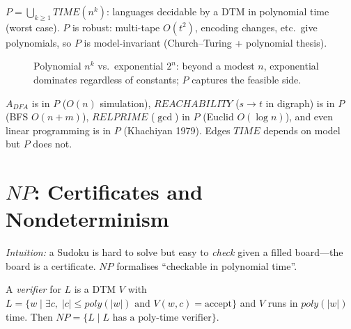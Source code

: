 \begin{definition}[$P$]
$P=\bigcup_{k\ge1}TIME(n^k)$: languages decidable by a DTM in polynomial time (worst case). $P$ is robust: multi-tape $O(t^2)$, encoding changes, etc.\ give polynomials, so $P$ is model-invariant (Church--Turing + polynomial thesis).
\end{definition}

\begin{figure}[h]
\centering
{}
\caption{Polynomial $n^k$ vs.\ exponential $2^n$: beyond a modest $n$, exponential dominates regardless of constants; $P$ captures the feasible side.}
\label{fig:poly-vs-exp}
\end{figure}

\begin{example}[Problems in $P$]
$A_{DFA}$ is in $P$ ($O(n)$ simulation), $REACHABILITY$ ($s\to t$ in digraph) is in $P$ (BFS $O(n+m)$), $RELPRIME$ ($\gcd$) in $P$ (Euclid $O(\log n)$), and even linear programming is in $P$ (Khachiyan 1979). Edges $TIME$ depends on model but $P$ does not.
\end{example}

\section{$NP$: Certificates and Nondeterminism}
\label{sec:NP}
\emph{Intuition:} a Sudoku is hard to solve but easy to \emph{check} given a filled board---the board is a certificate. $NP$ formalises ``checkable in polynomial time''.

\begin{definition}
A \emph{verifier} for $L$ is a DTM $V$ with $L=\{w\mid\exists c,\;|c|\le poly(|w|)\text{ and }V(w,c)=\text{accept}\}$ and $V$ runs in $poly(|w|)$ time. Then $NP=\{L\mid L\text{ has a poly-time verifier}\}$.
\end{definition}

